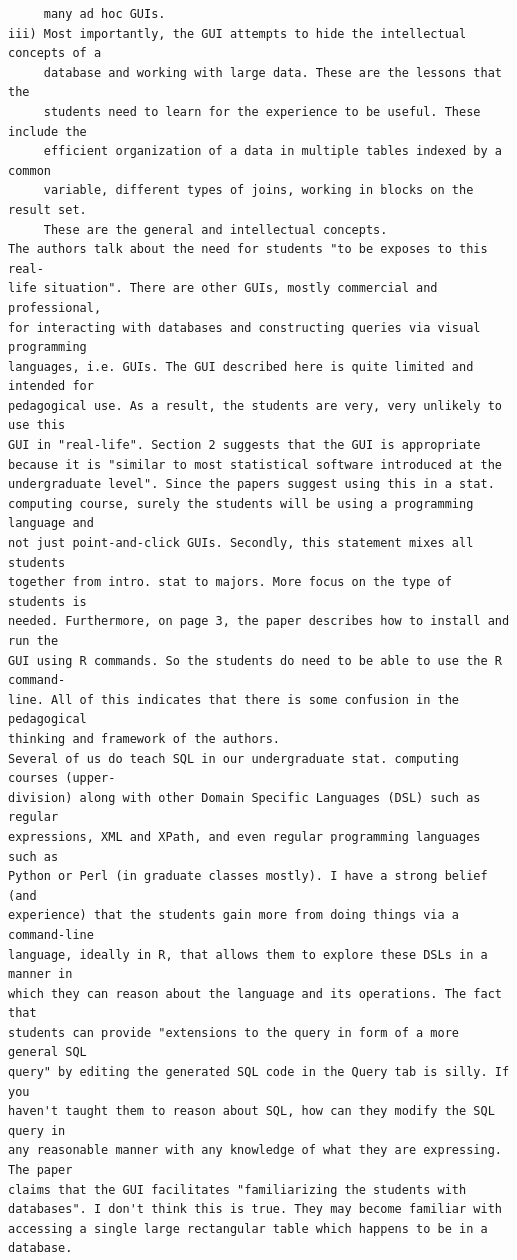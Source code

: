\documentclass[11pt]{tise_style}
\begin{document}
\begin{verbatim}
     many ad hoc GUIs.
iii) Most importantly, the GUI attempts to hide the intellectual concepts of a
     database and working with large data. These are the lessons that the
     students need to learn for the experience to be useful. These include the
     efficient organization of a data in multiple tables indexed by a common
     variable, different types of joins, working in blocks on the result set.
     These are the general and intellectual concepts.
The authors talk about the need for students "to be exposes to this real-
life situation". There are other GUIs, mostly commercial and professional,
for interacting with databases and constructing queries via visual programming
languages, i.e. GUIs. The GUI described here is quite limited and intended for
pedagogical use. As a result, the students are very, very unlikely to use this
GUI in "real-life". Section 2 suggests that the GUI is appropriate
because it is "similar to most statistical software introduced at the
undergraduate level". Since the papers suggest using this in a stat.
computing course, surely the students will be using a programming language and
not just point-and-click GUIs. Secondly, this statement mixes all students
together from intro. stat to majors. More focus on the type of students is
needed. Furthermore, on page 3, the paper describes how to install and run the
GUI using R commands. So the students do need to be able to use the R command-
line. All of this indicates that there is some confusion in the pedagogical
thinking and framework of the authors.
Several of us do teach SQL in our undergraduate stat. computing courses (upper-
division) along with other Domain Specific Languages (DSL) such as regular
expressions, XML and XPath, and even regular programming languages such as
Python or Perl (in graduate classes mostly). I have a strong belief (and
experience) that the students gain more from doing things via a command-line
language, ideally in R, that allows them to explore these DSLs in a manner in
which they can reason about the language and its operations. The fact that
students can provide "extensions to the query in form of a more general SQL
query" by editing the generated SQL code in the Query tab is silly. If you
haven't taught them to reason about SQL, how can they modify the SQL query in
any reasonable manner with any knowledge of what they are expressing. The paper
claims that the GUI facilitates "familiarizing the students with
databases". I don't think this is true. They may become familiar with
accessing a single large rectangular table which happens to be in a database.

\end{verbatim}
\end{document}
